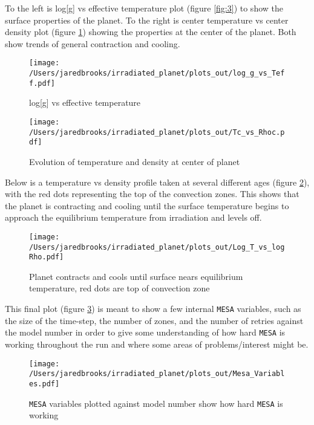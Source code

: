 \documentclass{article}
\begin{document}
        \pagebreak

        To the left is log[g] vs effective temperature plot (figure \ref{fig:3}) to show the surface properties of the planet.  To the right is center temperature vs center density plot (figure \ref{fig:4}) showing the properties at the center of the planet.  Both show trends of general contraction and cooling.

        \begin{figure}[H]
                \begin{minipage}[b]{0.5\linewidth}
                       \centering
                       \texttt{[image: /Users/jaredbrooks/irradiated\_planet/plots\_out/log\_g\_vs\_Teff.pdf]}
                       \caption{log[g] vs effective temperature}
                       \label{fig:3}
                \end{minipage}
                \hspace{0cm}
                \begin{minipage}[b]{0.5\linewidth}
                       \centering
                       \texttt{[image: /Users/jaredbrooks/irradiated\_planet/plots\_out/Tc\_vs\_Rhoc.pdf]}
                       \caption{Evolution of temperature and density at center of planet}
                       \label{fig:4}
                \end{minipage}
        \end{figure}

        \pagebreak

        Below is a temperature vs density profile taken at several different ages (figure \ref{fig:5}), with the red dots representing the top of the convection zones.  This shows that the planet is contracting and cooling until the surface temperature begins to approach the equilibrium temperature from irradiation and levels off.

        \begin{figure}[H]
                \centering
                \texttt{[image: /Users/jaredbrooks/irradiated\_planet/plots\_out/Log\_T\_vs\_logRho.pdf]}
                \caption{Planet contracts and cools until surface nears equilibrium temperature, red dots are top of convection zone}
                \label{fig:5}
        \end{figure}

        \pagebreak

        This final plot (figure \ref{fig:7}) is meant to show a few internal \texttt{MESA} variables, such as the size of the time-step, the number of zones, and the number of retries against the model number in order to give some understanding of how hard \texttt{MESA} is working throughout the run and where some areas of problems/interest might be.

        \begin{figure}[H]
                \centering
                \texttt{[image: /Users/jaredbrooks/irradiated\_planet/plots\_out/Mesa\_Variables.pdf]}
                \caption{\texttt{MESA} variables plotted against model number show how hard \texttt{MESA} is working}
                \label{fig:7}
        \end{figure}
\end{document}
